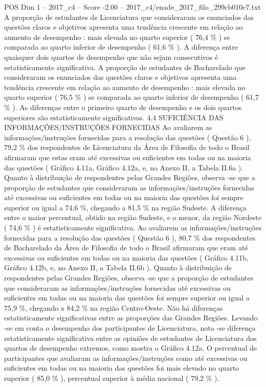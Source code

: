 \begin{textsample}{POS Dim 1 – 2017\_c4 – Score -2.00 – 2017\_c4/enade\_2017\_filo\_299cb010c7.txt}
A proporção de estudantes de Licenciatura que consideraram os enunciados das questões claros e objetivos apresenta uma tendência crescente em relação ao aumento de desempenho : mais elevada no quarto superior ( 76,4 \% ) se comparada ao quarto inferior de desempenho ( 61,6 \% ).
A diferença entre quaisquer dois quartos de desempenho que não sejam consecutivos é estatisticamente significativa.
A proporção de estudantes de Bacharelado que consideraram os enunciados das questões claros e objetivos apresenta uma tendência crescente em relação ao aumento de desempenho : mais elevada no quarto superior ( 76,5 \% ) se comparada ao quarto inferior de desempenho ( 61,7 \% ).
As diferenças entre o primeiro quarto de desempenho e os dois quartos superiores são estatisticamente significativas. 4.4 SUFICIÊNCIA DAS INFORMAÇÕES/INSTRUÇÕES FORNECIDAS Ao avaliarem as informações/instruções fornecidas para a resolução das questões ( Questão 6 ), 79,2 \% dos respondentes de Licenciatura da Área de Filosofia de todo o Brasil afirmaram que estas eram até excessivas ou suficientes em todas ou na maioria das questões ( Gráfico 4.11a, Gráfico 4.12a, e, no Anexo II, a Tabela II.6a ).
Quanto à distribuição de respondentes pelas Grandes Regiões, observa -se que a proporção de estudantes que consideraram as informações/instruções fornecidas até excessivas ou suficientes em todas ou na maioria das questões foi sempre superior ou igual a 74,6 \%, chegando a 81,5 \% na região Sudeste.
A diferença entre o maior percentual, obtido na região Sudeste, e o menor, da região Nordeste ( 74,6 \% ) é estatisticamente significativa.
Ao avaliarem as informações/instruções fornecidas para a resolução das questões ( Questão 6 ), 80,7 \% dos respondentes de Bacharelado da Área de Filosofia de todo o Brasil afirmaram que eram até excessivas ou suficientes em todas ou na maioria das questões ( Gráfico 4.11b, Gráfico 4.12b, e, no Anexo II, a Tabela II.6b ).
Quanto à distribuição de respondentes pelas Grandes Regiões, observa -se que a proporção de estudantes que consideraram as informações/instruções fornecidas até excessivas ou suficientes em todas ou na maioria das questões foi sempre superior ou igual a 75,9 \%, chegando a 84,2 \% na região Centro-Oeste.
Não há diferenças estatisticamente significativas entre as proporções das Grandes Regiões.
Levando -se em conta o desempenho dos participantes de Licenciatura, nota -se diferença estatisticamente significativa entre as opiniões de estudantes de Licenciatura dos quartos de desempenho extremos, como mostra o Gráfico 4.12a.
O percentual de participantes que avaliaram as informações/instruções como até excessivas ou suficientes em todas ou na maioria das questões foi mais elevado no quarto superior ( 85,0 \% ), percentual superior à média nacional ( 79,2 \% ).

\end{textsample}
